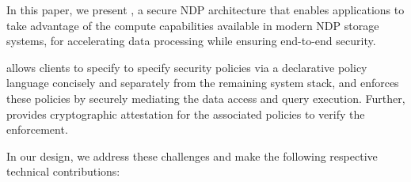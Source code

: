 In this paper, we present \project, a secure NDP architecture that enables applications to take advantage of the compute capabilities available in modern NDP storage systems, for accelerating data processing while ensuring end-to-end security.

\project allows clients to specify to specify security policies via a declarative policy language concisely and separately from the remaining system stack, and enforces these policies by securely mediating the data access and query execution. Further, \project provides
cryptographic attestation for the associated policies to verify the enforcement.



In our \project{} design, we address these challenges and make the following respective technical contributions:

